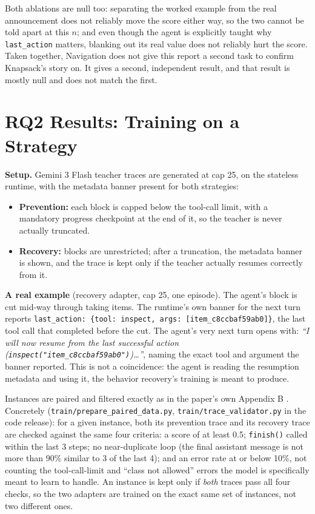 \documentclass[11pt,a4paper]{article}
\begin{document}
Both ablations are null too: separating the worked example from the real announcement does not
reliably move the score either way, so the two cannot be told apart at this $n$; and even though
the agent is explicitly taught why \texttt{last\_action} matters, blanking out its real value
does not reliably hurt the score. Taken together, Navigation does not give this report a second
task to confirm Knapsack's story on. It gives a second, independent result, and that result is
mostly null and does not match the first.

\section{RQ2 Results: Training on a Strategy}
\label{sec:rq2}

\textbf{Setup.} Gemini 3 Flash teacher traces are generated at cap 25, on the stateless runtime,
with the metadata banner present for both strategies:
\begin{itemize}
\item \textbf{Prevention:} each block is capped below the tool-call limit, with a mandatory
  progress checkpoint at the end of it, so the teacher is never actually truncated.
\item \textbf{Recovery:} blocks are unrestricted; after a truncation, the metadata banner is
  shown, and the trace is kept only if the teacher actually resumes correctly from it.
\end{itemize}

\begin{hyp}
\textbf{A real example} (recovery adapter, cap 25, one episode). The agent's block is cut
mid-way through taking items. The runtime's own banner for the next turn reports
\texttt{last\_action: \{tool: inspect, args: [item\_c8ccbaf59ab0]\}}, the last tool call that
completed before the cut. The agent's very next turn opens with: \textit{``I will now resume
from the last successful action (\texttt{inspect("item\_c8ccbaf59ab0")})\ldots''}, naming the
exact tool and argument the banner reported. This is not a coincidence: the agent is reading the
resumption metadata and using it, the behavior recovery's training is meant to produce.
\end{hyp}

Instances are paired and filtered exactly as in the paper's own Appendix B \cite{paper}.
Concretely (\texttt{train/prepare\_paired\_data.py}, \texttt{train/trace\_validator.py} in the
code release): for a given instance, both its prevention trace and its recovery trace are
checked against the same four criteria: a score of at least 0.5; \texttt{finish()} called
within the last 3 steps; no near-duplicate loop (the final assistant message is not more than
90\% similar to 3 of the last 4); and an error rate at or below 10\%, not counting the
tool-call-limit and ``class not allowed'' errors the model is specifically meant to learn to
handle. An instance is kept only if \emph{both} traces pass all four checks, so the two adapters
are trained on the exact same set of instances, not two different ones.
\end{document}
